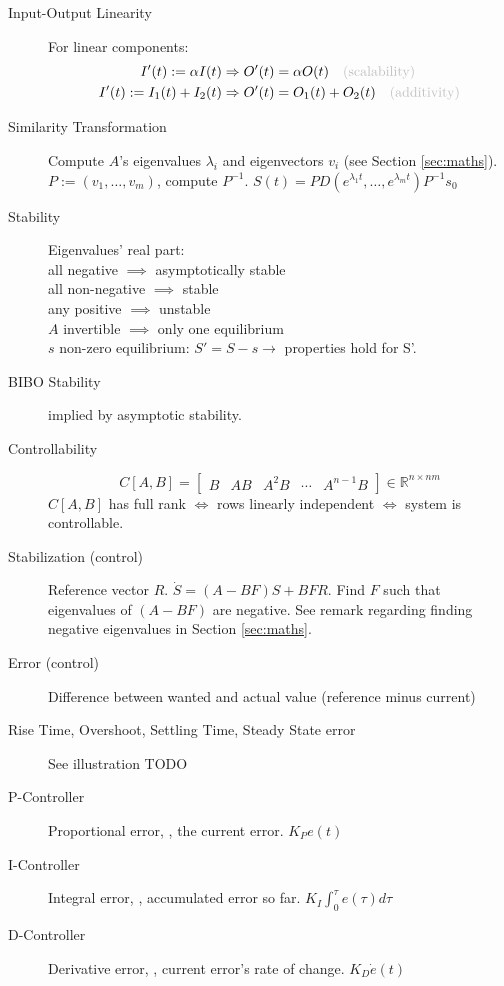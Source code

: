 \begin{description}
	\item[Input-Output Linearity] For linear components: \\
	\begin{align*}
	I'(t) := \alpha I(t) &\Rightarrow O'(t) = \alpha O(t) \NOTE{(scalability)}\\
	I'(t) := I_1(t) + I_2(t) &\Rightarrow O'(t) = O_1(t) + O_2(t) \NOTE{(additivity)}
	\end{align*}
	\item[Similarity Transformation] Compute $A$'s eigenvalues $\lambda_i$ and
	eigenvectors $v_i$ (see Section \ref{sec:maths}).\nl
	$P := (v_1,\ldots, v_m)$, compute $P^{-1}$. \nl
	$S(t) = PD(e^{\lambda_1t}, \ldots, e^{\lambda_mt})P^{-1} s_0$
	\item[Stability] Eigenvalues' real part:\\
    all negative $\implies$ asymptotically stable\\ 
	all non-negative $\implies$ stable\\
    any positive $\implies$ unstable\\
	$A$ invertible $\implies$ only one equilibrium\\
	$s$ non-zero equilibrium: $S' = S - s \rightarrow$ properties hold for S'. 
	\item[BIBO Stability] implied by asymptotic stability.
	\item[Controllability] \[C[A,B] = \left[ \begin{array}{ccccc}
    B & AB & A^{2}B & \cdots & A^{n-1}B \end{array} \right] \in \mathbb{R}^{n \times nm}\]
    $C[A,B]$ has full rank $\iff$ rows linearly independent $\iff$ system is controllable.
	\item[Stabilization (control)] Reference vector $R$. $\dot{S} = (A - BF)S + BFR$. Find
	$F$ such that eigenvalues of $(A - BF)$ are negative. See remark regarding
	finding negative eigenvalues in Section \ref{sec:maths}.
	\item[Error (control)] Difference between wanted and actual value (reference minus current)
	\item[Rise Time, Overshoot, Settling Time, Steady State error] See illustration
	TODO
	\item[P-Controller] Proportional error, \ie, the current error. $K_P e(t)$
	\item[I-Controller] Integral error, \ie, accumulated error so far. $K_I
	\int_0^\tau e(\tau) d\tau$
	\item[D-Controller] Derivative error, \ie, current error's rate of change.
	$K_D \dot{e}(t)$
\end{description}
